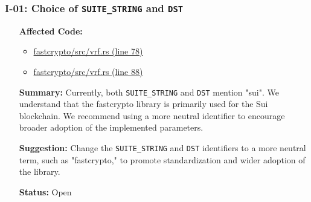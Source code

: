 \subsubsection*{I-01: Choice of \lstinline{SUITE_STRING} and \lstinline{DST}}
\begin{itemize}[align=left]
\item[\textbf{Affected Code:}]\
\begin{itemize}
\item \href{https://github.com/MystenLabs/fastcrypto/blob/963205c6d0538fe548b8b10037cf87a53af6f424/fastcrypto/src/vrf.rs#L78}{fastcrypto/src/vrf.rs (line 78)}
\item \href{https://github.com/MystenLabs/fastcrypto/blob/963205c6d0538fe548b8b10037cf87a53af6f424/fastcrypto/src/vrf.rs#L88}{fastcrypto/src/vrf.rs (line 88)}
\end{itemize}
\item[\textbf{Summary:}] Currently, both \lstinline{SUITE_STRING} and \lstinline{DST} mention "sui". We understand that the fastcrypto library is primarily used for the Sui blockchain. We recommend using a more neutral identifier to encourage broader adoption of the implemented parameters.
\item[\textbf{Suggestion:}] Change the \lstinline{SUITE_STRING} and \lstinline{DST} identifiers to a more neutral term, such as "fastcrypto," to promote standardization and wider adoption of the library.
\item[\textbf{Status:}] Open
\end{itemize}

